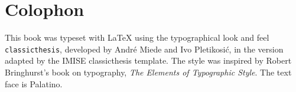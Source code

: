 \cleardoublepage
\pagestyle{empty}

\hfill

\vfill

\section*{Colophon}
This book was typeset with \LaTeX{} using the typographical look and feel \texttt{classicthesis}, developed by Andr\'e Miede and Ivo Pletikosi\'c, in the version adapted by the IMISE classicthesis template. The style was inspired by Robert Bringhurst's book on typography, \emph{The Elements of Typographic Style}. The text face is Palatino.

\bigskip

\noindent\myVersion
